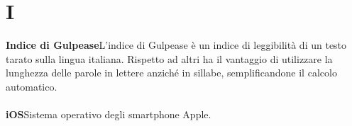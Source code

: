 \newpage
\section{I}\label{l:I}
\textbf{Indice di Gulpease}\newline L'indice di Gulpease è un indice di leggibilità di un testo tarato sulla lingua italiana. Rispetto ad altri ha il vantaggio di utilizzare la lunghezza delle parole in lettere anziché in sillabe, semplificandone il calcolo automatico.\\\\

\textbf{iOS}\newline Sistema operativo degli smartphone Apple.